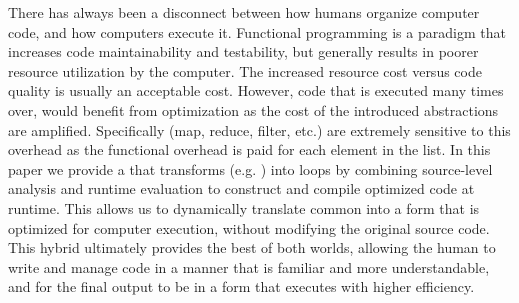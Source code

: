 There has always been a disconnect between how humans organize computer code, and how computers execute it.  Functional programming is a paradigm that increases code maintainability and testability, but generally results in poorer resource utilization by the computer.  The increased resource cost versus code quality is usually an acceptable cost. However, code that is executed many times over, would benefit from optimization as the cost of the introduced abstractions are amplified. Specifically \pipelines (map, reduce, filter, etc.) are extremely sensitive to this overhead as the functional overhead is paid for each element in the list. In this paper we provide a \javascript \algorithm that transforms \pipelines (e.g. ) into  loops by combining source-level analysis and runtime evaluation to construct and compile optimized code at runtime.  This \algorithm allows us to dynamically translate common \pipelines into a form that is optimized for computer execution, without modifying the original source code. This hybrid ultimately provides the best of both worlds, allowing the human to write and manage code in a manner that is familiar and more understandable, and for the final output to be in a form that executes with higher efficiency.